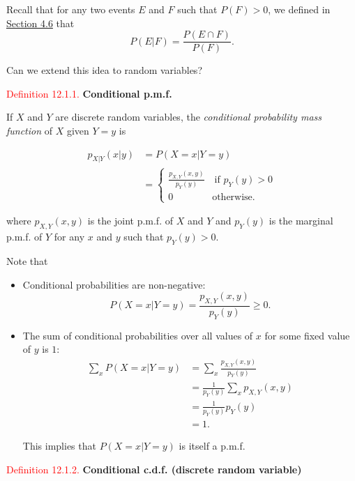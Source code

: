 \documentclass[
]{book}
\providecommand{\tightlist}{%
  \setlength{\itemsep}{0pt}\setlength{\parskip}{0pt}}
\begin{document}
Recall that for any two events \(E\) and \(F\) such that \(P(F)>0\), we defined in \protect\hyperlink{prob:Conditional_Probability}{Section 4.6} that
\[ P(E|F) = \frac{P(E \cap F)}{P(F)}.\]

Can we extend this idea to random variables?

\leavevmode{}%
\textcolor{red}{Definition 12.1.1.}
{\textbf{Conditional p.m.f.}}

If \(X\) and \(Y\) are discrete random variables, the \emph{conditional probability mass function} of \(X\) given \(Y=y\) is

\begin{align*}
p_{X|Y}(x|y) &= P(X=x|Y=y) \\
&= \begin{cases} \frac{p_{X,Y}(x,y)}{p_Y(y)} \quad \text{if } p_Y(y)>0 \\
0 \qquad \qquad \text{otherwise.} \end{cases}
\end{align*}

where \(p_{X,Y}(x,y)\) is the joint p.m.f. of \(X\) and \(Y\) and \(p_Y(y)\) is the marginal p.m.f. of \(Y\) for any \(x\) and \(y\) such that \(p_Y(y)>0\).

Note that

\begin{itemize}
\tightlist
\item
  Conditional probabilities are non-negative:\\

  \[P(X=x|Y=y)=\frac{p_{X,Y}(x,y)}{p_Y(y)} \geq 0.\]
\item
  The sum of conditional probabilities over all values of \(x\) for some fixed value of \(y\) is \(1\):\\

  \begin{align*}
  \sum_x P(X=x|Y=y) &= \sum\limits_x \frac{p_{X,Y}(x,y)}{p_Y(y)} \\
  &= \frac{1}{p_Y(y)} \sum\limits_x p_{X,Y}(x,y) \\
  &= \frac{1}{p_Y(y)}p_Y(y) \\
  &= 1.
  \end{align*}

  This implies that \(P(X=x|Y=y)\) is itself a p.m.f.
\end{itemize}

\leavevmode{}%
\textcolor{red}{Definition 12.1.2.}
{\textbf{Conditional c.d.f. (discrete random variable)}}
\end{document}
